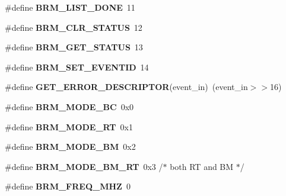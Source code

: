 \begin{DoxyCompactItemize}
\mbox{\label{group__B1553BRM_ga50ca53ae15714e3afb6ab3fc245715f9}} 
\#define {\bfseries B\+R\+M\+\_\+\+L\+I\+S\+T\+\_\+\+D\+O\+NE}~11
\item 
\mbox{\label{group__B1553BRM_ga2d7be34befba9a99befa87641f7eee17}} 
\#define {\bfseries B\+R\+M\+\_\+\+C\+L\+R\+\_\+\+S\+T\+A\+T\+US}~12
\item 
\mbox{\label{group__B1553BRM_gae8d23b0f0fd4c1725352a8513c228a9b}} 
\#define {\bfseries B\+R\+M\+\_\+\+G\+E\+T\+\_\+\+S\+T\+A\+T\+US}~13
\item 
\mbox{\label{group__B1553BRM_gab8d7d4a1454f07ca2c37e3e963d483a2}} 
\#define {\bfseries B\+R\+M\+\_\+\+S\+E\+T\+\_\+\+E\+V\+E\+N\+T\+ID}~14
\item 
\mbox{\label{group__B1553BRM_ga18c045638dbcfd8ce574a8ada6e2a442}} 
\#define {\bfseries G\+E\+T\+\_\+\+E\+R\+R\+O\+R\+\_\+\+D\+E\+S\+C\+R\+I\+P\+T\+OR}(event\+\_\+in)~(event\+\_\+in$>$$>$16)
\item 
\mbox{\label{group__B1553BRM_ga88d7690ecb30917480119f75131e2e43}} 
\#define {\bfseries B\+R\+M\+\_\+\+M\+O\+D\+E\+\_\+\+BC}~0x0
\item 
\mbox{\label{group__B1553BRM_gac40c0ed8a52299318d227f3ffe08e583}} 
\#define {\bfseries B\+R\+M\+\_\+\+M\+O\+D\+E\+\_\+\+RT}~0x1
\item 
\mbox{\label{group__B1553BRM_ga17c06e7a499101204e13523f6fe3b42a}} 
\#define {\bfseries B\+R\+M\+\_\+\+M\+O\+D\+E\+\_\+\+BM}~0x2
\item 
\mbox{\label{group__B1553BRM_ga6004834e256f92a1f3132977c232709b}} 
\#define {\bfseries B\+R\+M\+\_\+\+M\+O\+D\+E\+\_\+\+B\+M\+\_\+\+RT}~0x3 /$\ast$ both R\+T and B\+M $\ast$/
\item 
\mbox{\label{group__B1553BRM_ga6ed24c98784dbf1cf60b713d3995bdd7}} 
\#define {\bfseries B\+R\+M\+\_\+\+F\+R\+E\+Q\+\_\+M\+HZ}~0
\item 
\mbox{\label{group__B1553BRM_ga97c0ef26ed8c6176f033cbc0923eb1ec}} 
$$
\end{DoxyCompactItemize}
